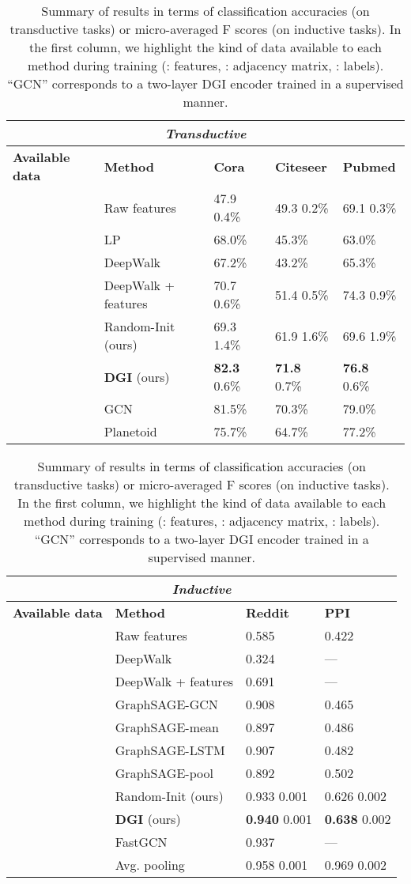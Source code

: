 \documentclass{article} \usepackage{iclr2019_conference,times}
\begin{document}
\begin{table}[ht]
\caption{Summary of results in terms of classification accuracies (on transductive tasks) or micro-averaged F scores (on inductive tasks). In the first column, we highlight the kind of data available to each method during training (: features, : adjacency matrix, : labels). ``GCN'' corresponds to a two-layer DGI encoder trained in a supervised manner.}
\label{transtable}
\begin{center}
\begin{tabular}{l l l l l}
\multicolumn{5}{c}{\textbf{\emph{Transductive}}}\\
\toprule
{\bf Available data} & {\bf Method} & {\bf Cora} & {\bf Citeseer} & {\bf Pubmed}\\ \midrule
 & Raw features & 47.9  0.4\% & 49.3  0.2\% & 69.1  0.3\%\\
 & LP \citep{zhu2003semi} & 68.0\% & 45.3\% & 63.0\%\\
 & DeepWalk \citep{perozzi2014deepwalk} & 67.2\% & 43.2\% & 65.3\%\\
 & DeepWalk + features & 70.7  0.6\% & 51.4  0.5\% & 74.3  0.9\%\\\midrule
 & Random-Init (ours) & 69.3  1.4\% & 61.9  1.6\% & 69.6  1.9\% \\
 & {\bf DGI} (ours) & {\bf 82.3}  0.6\% & {\bf 71.8}  0.7\% & {\bf 76.8}  0.6\%\\\midrule
 & GCN \citep{kipf2016semi} & 81.5\% & 70.3\% & 79.0\%\\
 & Planetoid \citep{yang2016revisiting} & 75.7\% & 64.7\% & 77.2\%\\
\bottomrule \end{tabular}
\begin{tabular}{l l l l}
\\
\multicolumn{4}{c}{\textbf{\emph{Inductive}}}\\
\toprule 
{\bf Available data} & {\bf Method} & {\bf Reddit} & {\bf PPI}\\ \midrule
 & Raw features & 0.585 & 0.422 \\
 & DeepWalk \citep{perozzi2014deepwalk} & 0.324 & --- \\
 & DeepWalk + features & 0.691 & --- \\ \midrule
 & GraphSAGE-GCN \citep{hamilton2017inductive} & 0.908 & 0.465 \\
 & GraphSAGE-mean \citep{hamilton2017inductive} & 0.897 & 0.486 \\
 & GraphSAGE-LSTM \citep{hamilton2017inductive} & 0.907 & 0.482 \\
 & GraphSAGE-pool \citep{hamilton2017inductive} & 0.892 & 0.502 \\\midrule
 & Random-Init (ours) & 0.933  0.001 & {0.626}  0.002 \\
 & {\bf DGI} (ours) & {\bf 0.940}  0.001 & {\bf 0.638}  0.002  \\\midrule
 & FastGCN \citep{chen2018fastgcn} & 0.937 & ---\\
 & Avg. pooling \citep{zhang2018gaan} & 0.958  0.001 & 0.969  0.002\\
\bottomrule
\end{tabular}
\end{center}
\end{table}
\end{document}
